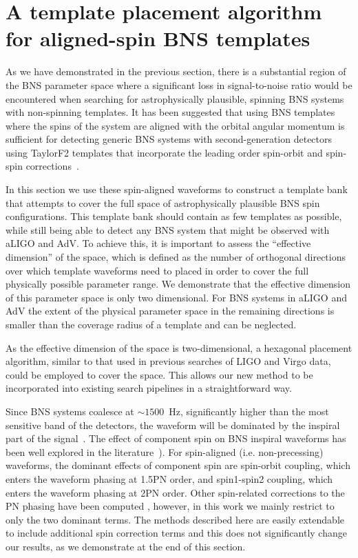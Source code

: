 \section{A template placement algorithm for aligned-spin BNS templates}
\label{sec:param_space}

As we have demonstrated in the previous section, there is a substantial region
of the BNS parameter space where a significant loss in signal-to-noise ratio
would be encountered when searching for astrophysically plausible, spinning
BNS systems with non-spinning templates. It has been suggested that using BNS
templates where the spins of the system are aligned with the orbital angular
momentum is sufficient for detecting generic BNS systems with second-generation
detectors~\cite{Ajith:2011ec} using TaylorF2 templates that incorporate the
leading order spin-orbit and spin-spin corrections~\cite{PW95}. 

In this section we use these spin-aligned waveforms to construct a template
bank that attempts to cover the full space of astrophysically plausible BNS
spin configurations. This template bank should contain as few templates as
possible, while still being able to detect any BNS system that might be
observed with aLIGO and AdV. To achieve this, it is important to assess the
``effective dimension'' of the space, which is defined as the number of orthogonal
directions
over which template waveforms need to placed in order to cover the full physically
possible parameter range. 
We demonstrate that the effective dimension
of this parameter space is only two dimensional. For BNS systems in aLIGO and AdV
the extent of the physical parameter space in the remaining directions is smaller
than the coverage radius of a template and can be neglected.

As the effective dimension of the space is two-dimensional, a
hexagonal placement algorithm, similar to that used in previous searches of
LIGO and Virgo data, could be employed to cover the space. This allows our new
method to be incorporated into existing search pipelines in a straightforward
way.

Since BNS systems coalesce at $\sim 1500$~Hz, significantly higher than the
most sensitive band of the detectors, the waveform will be dominated by the
inspiral part of the signal~\cite{Buonanno:2009zt}.  The effect of component
spin on BNS inspiral waveforms has been well explored in the
literature~\cite{Apostolatos:1994mx,Kidder:1992fr,Kidder:1995zr,BCV03b}).
For spin-aligned (i.e. non-precessing) waveforms, the dominant effects of
component spin are spin-orbit coupling, which enters the waveform phasing at
1.5PN order, and spin1-spin2 coupling, which enters the waveform phasing at
2PN order.  Other spin-related corrections to the PN phasing have been
computed \cite{Mikoczi:2005dn,Arun:2008kb}, however, in this work we mainly restrict
to only the two dominant terms. The methods described here are easily
extendable to include additional spin correction terms and this does not
significantly change our results, as we demonstrate at the end of this section.

